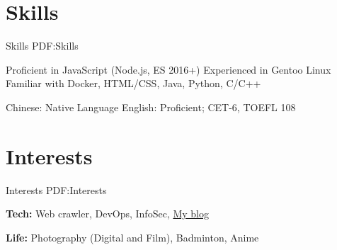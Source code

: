 \documentclass[a4paper,MMMyyyy,nonstop]{simpleresumecv}
\begin{document}
\begin{body}

\section
{Skills}
{Skills}
{PDF:Skills}

Proficient in JavaScript (Node.js, ES 2016+) \newline
Experienced in Gentoo Linux \newline
Familiar with Docker, HTML/CSS, Java, Python, C/C++

\Gap

Chinese: Native Language \newline
English: Proficient; CET-6, TOEFL 108 \newline


\section
{Interests}
{Interests}
{PDF:Interests}

\textbf{Tech: } Web crawler, DevOps, InfoSec, \href{https://wacky.one/}{My blog}

\textbf{Life: } Photography (Digital and Film), Badminton, Anime

\end{body}
\end{document}
